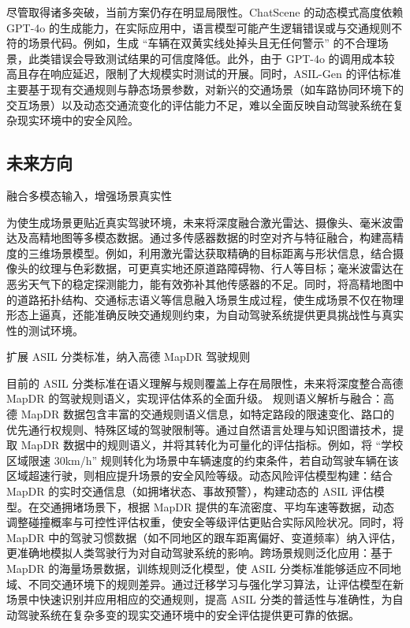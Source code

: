 尽管取得诸多突破，当前方案仍存在明显局限性。ChatScene 的动态模式高度依赖 GPT-4o 的生成能力，在实际应用中，语言模型可能产生逻辑错误或与交通规则不符的场景代码。例如，生成 “车辆在双黄实线处掉头且无任何警示” 的不合理场景，此类错误会导致测试结果的可信度降低。此外，由于 GPT-4o 的调用成本较高且存在响应延迟，限制了大规模实时测试的开展。同时，ASIL-Gen 的评估标准主要基于现有交通规则与静态场景参数，对新兴的交通场景（如车路协同环境下的交互场景）以及动态交通流变化的评估能力不足，难以全面反映自动驾驶系统在复杂现实环境中的安全风险。

\subsection{未来方向}

融合多模态输入，增强场景真实性

为使生成场景更贴近真实驾驶环境，未来将深度融合激光雷达、摄像头、毫米波雷达及高精地图等多模态数据。通过多传感器数据的时空对齐与特征融合，构建高精度的三维场景模型。例如，利用激光雷达获取精确的目标距离与形状信息，结合摄像头的纹理与色彩数据，可更真实地还原道路障碍物、行人等目标；毫米波雷达在恶劣天气下的稳定探测能力，能有效弥补其他传感器的不足。同时，将高精地图中的道路拓扑结构、交通标志语义等信息融入场景生成过程，使生成场景不仅在物理形态上逼真，还能准确反映交通规则约束，为自动驾驶系统提供更具挑战性与真实性的测试环境。



扩展 ASIL 分类标准，纳入高德 MapDR 驾驶规则

目前的 ASIL 分类标准在语义理解与规则覆盖上存在局限性，未来将深度整合高德 MapDR 的驾驶规则语义，实现评估体系的全面升级。​
规则语义解析与融合：高德 MapDR 数据包含丰富的交通规则语义信息，如特定路段的限速变化、路口的优先通行权规则、特殊区域的驾驶限制等。通过自然语言处理与知识图谱技术，提取 MapDR 数据中的规则语义，并将其转化为可量化的评估指标。例如，将 “学校区域限速 30km/h” 规则转化为场景中车辆速度的约束条件，若自动驾驶车辆在该区域超速行驶，则相应提升场景的安全风险等级。​
动态风险评估模型构建：结合 MapDR 的实时交通信息（如拥堵状态、事故预警），构建动态的 ASIL 评估模型。在交通拥堵场景下，根据 MapDR 提供的车流密度、平均车速等数据，动态调整碰撞概率与可控性评估权重，使安全等级评估更贴合实际风险状况。同时，将 MapDR 中的驾驶习惯数据（如不同地区的跟车距离偏好、变道频率）纳入评估，更准确地模拟人类驾驶行为对自动驾驶系统的影响。​
跨场景规则泛化应用：基于 MapDR 的海量场景数据，训练规则泛化模型，使 ASIL 分类标准能够适应不同地域、不同交通环境下的规则差异。通过迁移学习与强化学习算法，让评估模型在新场景中快速识别并应用相应的交通规则，提高 ASIL 分类的普适性与准确性，为自动驾驶系统在复杂多变的现实交通环境中的安全评估提供更可靠的依据。

\newpage


